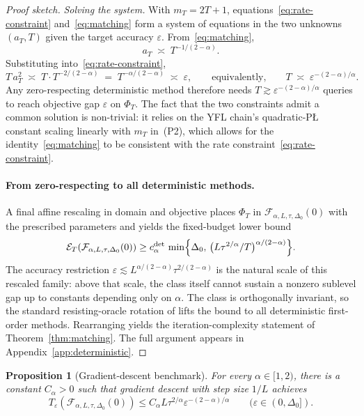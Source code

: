 \documentclass[11pt]{article}
\newtheorem{proposition}[theorem]{Proposition}
\begin{document}
\begin{proof}[Proof sketch]
\smallskip
\noindent\emph{Solving the system.} With \(m_T=2T+1\), equations~\eqref{eq:rate-constraint}
and~\eqref{eq:matching} form a system of equations in the two unknowns \((a_T,T)\) given the target accuracy
\(\varepsilon\). From~\eqref{eq:matching},
\[
a_T\;\asymp\;T^{-1/(2-\alpha)}.
\]
Substituting into~\eqref{eq:rate-constraint},
\[
T\,a_T^2\;\asymp\;T\cdot T^{-2/(2-\alpha)}\;=\;T^{-\alpha/(2-\alpha)}\;\asymp\;\varepsilon,
\qquad\text{equivalently,}\qquad
T\;\asymp\;\varepsilon^{-(2-\alpha)/\alpha}.
\]
Any zero-respecting deterministic method therefore needs
\(T\gtrsim\varepsilon^{-(2-\alpha)/\alpha}\) queries to reach objective gap \(\varepsilon\) on \(\Phi_T\).
The fact that the two constraints admit a common solution is non-trivial: it relies on the YFL chain's quadratic-P\L{}
constant scaling linearly with \(m_T\) in~(P2), which allows for the
identity~\eqref{eq:matching} to be consistent with the rate constraint~\eqref{eq:rate-constraint}.

\paragraph{From zero-respecting to all deterministic methods.}
A final affine rescaling in domain and objective places \(\Phi_T\) in \(\mathcal F_{\alpha,L,\tau,\Delta_0}(0)\) with
the prescribed parameters and yields the fixed-budget lower bound
\[
\mathcal E_T\!\left(\mathcal F_{\alpha,L,\tau,\Delta_0}(0)\right)
\ge
c_\alpha^{\mathrm{det}}\,
\min\Bigl\{\Delta_0,\,\bigl(L\tau^{2/\alpha}/T\bigr)^{\alpha/(2-\alpha)}\Bigr\}.
\]
The accuracy restriction \(\varepsilon\lesssim L^{\alpha/(2-\alpha)}\tau^{2/(2-\alpha)}\) is the natural scale of this rescaled family:
above that scale, the class itself cannot sustain a nonzero sublevel gap up to constants depending only on \(\alpha\).
The class is orthogonally invariant, so the standard resisting-oracle rotation of
\citet[Proposition~1]{CarmonDuchiHinderSidford2021} lifts the bound to all deterministic first-order methods.
Rearranging yields the iteration-complexity statement of Theorem~\ref{thm:matching}. The full argument appears in
Appendix~\ref{app:deterministic}.
\end{proof}

\begin{proposition}[Gradient-descent benchmark]
\label{prop:gd-main}
For every \(\alpha\in[1,2)\), there is a constant \(C_\alpha>0\) such that gradient descent with step size \(1/L\)
achieves
\[
T_\varepsilon\!\left(\mathcal F_{\alpha,L,\tau,\Delta_0}(0)\right)
\le
C_\alpha L\tau^{2/\alpha}\varepsilon^{-(2-\alpha)/\alpha}
\qquad
(\varepsilon\in(0,\Delta_0]).
\]
\end{proposition}
\end{document}
